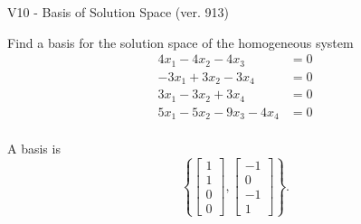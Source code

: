 \begin{exercise}
  \begin{exerciseTitle}V10 - Basis of Solution Space (ver. 913)\end{exerciseTitle}
  \begin{exerciseStatement}
    Find a basis for the solution space of the homogeneous system 
\begin{align*}
 4 x_ 1 -4 x_ 2 -4 x_ 3 &= 0  \\ 
  -3 x_ 1 + 3 x_ 2 -3 x_ 4 &= 0  \\ 
  3 x_ 1 -3 x_ 2 + 3 x_ 4 &= 0  \\ 
  5 x_ 1 -5 x_ 2 -9 x_ 3 -4 x_ 4 &= 0  \\ 
 \end{align*}


 
  \end{exerciseStatement}

  \begin{exerciseAnswer}
   A basis is   
\[\left\{\left[\begin{array}{c}
1 \\
1 \\
0 \\
0
\end{array}\right] , \left[\begin{array}{c}
-1 \\
0 \\
-1 \\
1
\end{array}\right]\right\}.\]

  


  \end{exerciseAnswer}
\end{exercise}